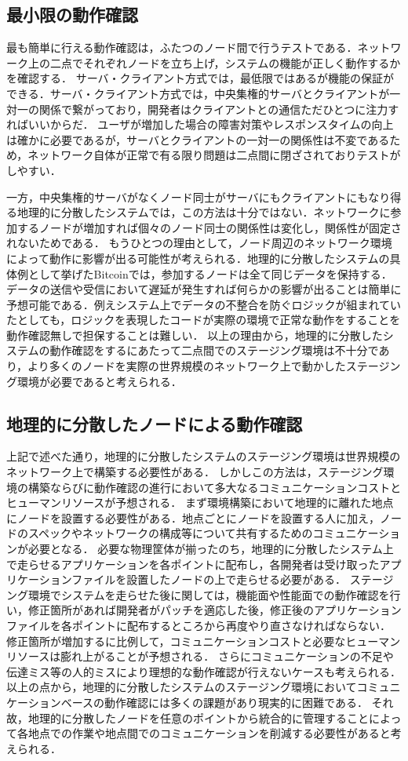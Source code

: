 \subsection{最小限の動作確認}
最も簡単に行える動作確認は，ふたつのノード間で行うテストである．ネットワーク上の二点でそれぞれノードを立ち上げ，システムの機能が正しく動作するかを確認する．
サーバ・クライアント方式では，最低限ではあるが機能の保証ができる．サーバ・クライアント方式では，中央集権的サーバとクライアントが一対一の関係で繋がっており，開発者はクライアントとの通信ただひとつに注力すればいいからだ．
ユーザが増加した場合の障害対策やレスポンスタイムの向上は確かに必要であるが，サーバとクライアントの一対一の関係性は不変であるため，ネットワーク自体が正常で有る限り問題は二点間に閉ざされておりテストがしやすい．

一方，中央集権的サーバがなくノード同士がサーバにもクライアントにもなり得る地理的に分散したシステムでは，この方法は十分ではない．ネットワークに参加するノードが増加すれば個々のノード同士の関係性は変化し，関係性が固定されないためである．
もうひとつの理由として，ノード周辺のネットワーク環境によって動作に影響が出る可能性が考えられる．地理的に分散したシステムの具体例として挙げたBitcoinでは，参加するノードは全て同じデータを保持する．
データの送信や受信において遅延が発生すれば何らかの影響が出ることは簡単に予想可能である．例えシステム上でデータの不整合を防ぐロジックが組まれていたとしても，ロジックを表現したコードが実際の環境で正常な動作をすることを動作確認無しで担保することは難しい．
以上の理由から，地理的に分散したシステムの動作確認をするにあたって二点間でのステージング環境は不十分であり，より多くのノードを実際の世界規模のネットワーク上で動かしたステージング環境が必要であると考えられる．

\subsection{地理的に分散したノードによる動作確認}
上記で述べた通り，地理的に分散したシステムのステージング環境は世界規模のネットワーク上で構築する必要性がある．
しかしこの方法は，ステージング環境の構築ならびに動作確認の進行において多大なるコミュニケーションコストとヒューマンリソースが予想される．
まず環境構築において地理的に離れた地点にノードを設置する必要性がある．地点ごとにノードを設置する人に加え，ノードのスペックやネットワークの構成等について共有するためのコミュニケーションが必要となる．
必要な物理筐体が揃ったのち，地理的に分散したシステム上で走らせるアプリケーションを各ポイントに配布し，各開発者は受け取ったアプリケーションファイルを設置したノードの上で走らせる必要がある．
ステージング環境でシステムを走らせた後に関しては，機能面や性能面での動作確認を行い，修正箇所があれば開発者がパッチを適応した後，修正後のアプリケーションファイルを各ポイントに配布するところから再度やり直さなければならない．
修正箇所が増加するに比例して，コミュニケーションコストと必要なヒューマンリソースは膨れ上がることが予想される．
さらにコミュニケーションの不足や伝達ミス等の人的ミスにより理想的な動作確認が行えないケースも考えられる．
以上の点から，地理的に分散したシステムのステージング環境においてコミュニケーションベースの動作確認には多くの課題があり現実的に困難である．
それ故，地理的に分散したノードを任意のポイントから統合的に管理することによって各地点での作業や地点間でのコミュニケーションを削減する必要性があると考えられる．

